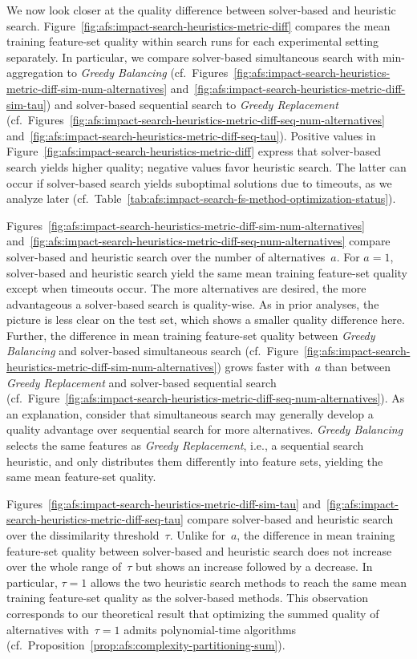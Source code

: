 \documentclass{article}
\theoremstyle{definition}
\begin{document}
We now look closer at the quality difference between solver-based and heuristic search.
Figure~\ref{fig:afs:impact-search-heuristics-metric-diff} compares the mean training feature-set quality within search runs for each experimental setting separately.
In particular, we compare solver-based simultaneous search with min-aggregation to \emph{Greedy Balancing} (cf.~Figures~\ref{fig:afs:impact-search-heuristics-metric-diff-sim-num-alternatives} and~\ref{fig:afs:impact-search-heuristics-metric-diff-sim-tau}) and solver-based sequential search to \emph{Greedy Replacement} (cf.~Figures~\ref{fig:afs:impact-search-heuristics-metric-diff-seq-num-alternatives} and~\ref{fig:afs:impact-search-heuristics-metric-diff-seq-tau}).
Positive values in Figure~\ref{fig:afs:impact-search-heuristics-metric-diff} express that solver-based search yields higher quality; negative values favor heuristic search.
The latter can occur if solver-based search yields suboptimal solutions due to timeouts, as we analyze later (cf.~Table~\ref{tab:afs:impact-search-fs-method-optimization-status}).

Figures~\ref{fig:afs:impact-search-heuristics-metric-diff-sim-num-alternatives} and~\ref{fig:afs:impact-search-heuristics-metric-diff-seq-num-alternatives} compare solver-based and heuristic search over the number of alternatives~$a$.
For $a=1$, solver-based and heuristic search yield the same mean training feature-set quality except when timeouts occur.
The more alternatives are desired, the more advantageous a solver-based search is quality-wise.
As in prior analyses, the picture is less clear on the test set, which shows a smaller quality difference here.
Further, the difference in mean training feature-set quality between \emph{Greedy Balancing} and solver-based simultaneous search (cf.~Figure~\ref{fig:afs:impact-search-heuristics-metric-diff-sim-num-alternatives}) grows faster with~$a$ than between \emph{Greedy Replacement} and solver-based sequential search (cf.~Figure~\ref{fig:afs:impact-search-heuristics-metric-diff-seq-num-alternatives}).
As an explanation, consider that simultaneous search may generally develop a quality advantage over sequential search for more alternatives.
\emph{Greedy Balancing} selects the same features as \emph{Greedy Replacement}, i.e., a sequential search heuristic, and only distributes them differently into feature sets, yielding the same mean feature-set quality.

Figures~\ref{fig:afs:impact-search-heuristics-metric-diff-sim-tau} and~\ref{fig:afs:impact-search-heuristics-metric-diff-seq-tau} compare solver-based and heuristic search over the dissimilarity threshold~$\tau$.
Unlike for~$a$, the difference in mean training feature-set quality between solver-based and heuristic search does not increase over the whole range of~$\tau$ but shows an increase followed by a decrease.
In particular, $\tau=1$ allows the two heuristic search methods to reach the same mean training feature-set quality as the solver-based methods.
This observation corresponds to our theoretical result that optimizing the summed quality of alternatives with~$\tau=1$ admits polynomial-time algorithms (cf.~Proposition~\ref{prop:afs:complexity-partitioning-sum}).
\end{document}
